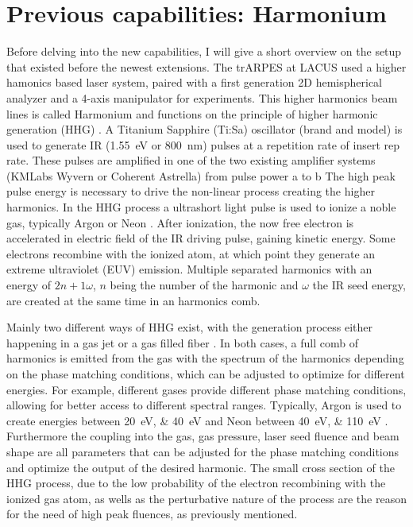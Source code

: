 \section{Previous capabilities: Harmonium}

Before delving into the new capabilities, I will give a short overview on the setup that existed before the newest extensions.
The trARPES at LACUS used a higher hamonics based laser system, paired with a first generation 2D hemispherical analyzer and a 4-axis manipulator for experiments.
This higher harmonics beam lines is called Harmonium and functions on the principle of higher harmonic generation (HHG) \cite{arrell_harmonium_2017}.
A Titanium Sapphire (Ti:Sa) oscillator (brand and model) is used to generate IR (\qty{1.55}{\electronvolt} or \qty{800}{\nano\meter}) pulses at a repetition rate of insert rep rate.
These pulses are amplified in one of the two existing amplifier systems (KMLabs Wyvern or Coherent Astrella) from pulse power a to b
The high peak pulse energy is necessary to drive the non-linear process creating the higher harmonics.
In the HHG process a ultrashort light pulse is used to ionize a noble gas, typically Argon or Neon \cite{rudawski_high-flux_2013}.
After ionization, the now free electron is accelerated in electric field of the IR driving pulse, gaining kinetic energy.
Some electrons recombine with the ionized atom, at which point they generate an extreme ultraviolet (EUV) emission.
Multiple separated harmonics with an energy of $2n+1 \omega$, $n$ being the number of the harmonic and $\omega$ the IR seed energy, are created at the same time in an harmonics comb.

Mainly two different ways of HHG exist, with the generation process either happening in a gas jet or a gas filled fiber \cite{paul_quasi-phase-matched_2003, heckl_high_2009, sudmeyer_femtosecond_2008, roser_131w220fs_2005}.
In both cases, a full comb of harmonics is emitted from the gas with the spectrum of the harmonics depending on the phase matching conditions, which can be adjusted to optimize for different energies.
For example, different gases provide different phase matching conditions, allowing for better access to different spectral ranges.
Typically, Argon is used to create energies between \qtylist{20; 40}{\electronvolt} and Neon between \qtylist{40; 110}{\electronvolt} \cite{rudawski_high-flux_2013}.
Furthermore the coupling into the gas, gas pressure, laser seed fluence and beam shape are all parameters that can be adjusted for the phase matching conditions and optimize the output of the desired harmonic.
The small cross section of the HHG process, due to the low probability of the electron recombining with the ionized gas atom, as wells as the perturbative nature of the process are the reason for the need of high peak fluences, as previously mentioned.

